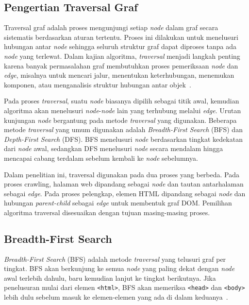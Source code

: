 \subsection{Pengertian Traversal Graf}
Traversal graf adalah proses mengunjungi setiap \textit{node} dalam graf secara sistematis berdasarkan aturan tertentu. Proses ini dilakukan untuk menelusuri hubungan antar \textit{node} sehingga seluruh struktur graf dapat diproses tanpa ada \textit{node} yang terlewat. Dalam kajian algoritma, \textit{traversal} menjadi langkah penting karena banyak permasalahan graf membutuhkan proses pemeriksaan \textit{node} dan \textit{edge}, misalnya untuk mencari jalur, menentukan keterhubungan, menemukan komponen, atau menganalisis struktur hubungan antar objek~\cite{cormen:22:introalgo}.

Pada proses \textit{traversal}, suatu \textit{node} biasanya dipilih sebagai titik awal, kemudian algoritma akan menelusuri \textit{node}-\textit{node} lain yang terhubung melalui \textit{edge}. Urutan kunjungan \textit{node} bergantung pada metode \textit{traversal} yang digunakan. Beberapa metode \textit{traversal} yang umum digunakan adalah {\it Breadth-First Search} (BFS) dan {\it Depth-First Search} (DFS). BFS menelusuri \textit{node} berdasarkan tingkat kedekatan dari \textit{node} awal, sedangkan DFS menelusuri \textit{node} secara mendalam hingga mencapai cabang terdalam sebelum kembali ke \textit{node} sebelumnya.

Dalam penelitian ini, traversal digunakan pada dua proses yang berbeda. Pada proses crawling, halaman web dipandang sebagai \textit{node} dan tautan antarhalaman sebagai \textit{edge}. Pada proses pelengkap, elemen HTML dipandang sebagai \textit{node} dan hubungan \textit{parent-child} sebagai \textit{edge} untuk membentuk graf DOM. Pemilihan algoritma traversal disesuaikan dengan tujuan masing-masing proses.

\subsection{Breadth-First Search}
\textit{Breadth-First Search} (BFS) adalah metode \textit{traversal} yang telusuri graf per tingkat. BFS akan berkunjung ke semua \textit{node} yang paling dekat dengan \textit{node} awal terlebih dahulu, baru kemudian lanjut ke tingkat berikutnya. Jika penelusuran mulai dari elemen \texttt{<html>}, BFS akan memeriksa \texttt{<head>} dan \texttt{<body>} lebih dulu sebelum masuk ke elemen-elemen yang ada di dalam keduanya~\cite{cormen:22:introalgo}.

